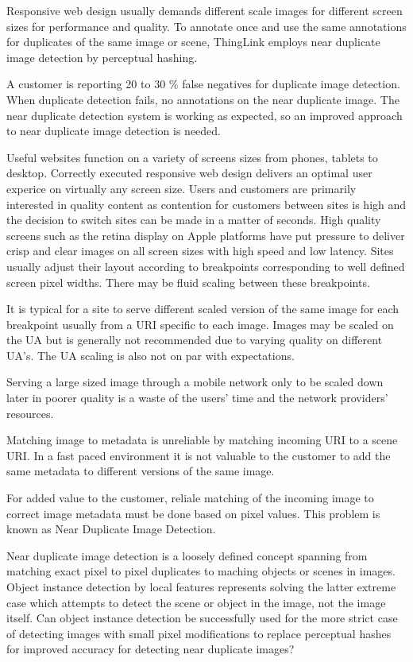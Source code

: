 \documentclass[english,12pt,a4paper,pdftex,elec,utf8]{aaltothesis}
\begin{document}
Responsive web design usually demands different scale images for different screen sizes for performance and quality. To annotate once and use the same annotations for duplicates of the same image or scene, ThingLink employs near duplicate image detection by perceptual hashing.

A customer is reporting 20 to 30 \% false negatives for duplicate image detection. When duplicate detection fails,  no annotations on the near duplicate image. The near duplicate detection system is working as expected, so an improved approach to near duplicate image detection is needed.

Useful websites function on a variety of screens sizes from phones, tablets to desktop. Correctly executed responsive web design delivers an optimal user experice on virtually any screen size. Users and customers are primarily interested in quality content as contention for customers between sites is high and the decision to switch sites can be made in a matter of seconds. High quality screens such as the retina display on Apple platforms have put pressure to deliver crisp and clear images on all screen sizes with high speed and low latency. Sites usually adjust their layout according to breakpoints corresponding to well defined screen pixel widths. There may be fluid scaling between these breakpoints.

It is typical for a site to serve different scaled version of the same image for each breakpoint usually from a URI specific to each image. Images may be scaled on the UA but is generally not recommended due to varying quality on different UA's. The UA scaling is also not on par with expectations.

Serving a large sized image through a mobile network only to be scaled down later in poorer quality is a waste of the users' time and the network providers' resources.

Matching image to metadata is unreliable by matching incoming URI to a scene URI. In a fast paced environment it is not valuable to the customer to add the same metadata to different versions of the same image.

For added value to the customer, reliale matching of the incoming image to correct image metadata must be done based on pixel values. This problem is known as Near Duplicate Image Detection.

Near duplicate image detection is a loosely defined concept spanning from matching exact pixel to pixel duplicates to maching objects or scenes in images. Object instance detection by local features represents solving the latter extreme case which attempts to detect the scene or object in the image, not the image itself. Can object instance detection be successfully used for the more strict case of detecting images with small pixel modifications to replace perceptual hashes for improved accuracy for detecting near duplicate images?
\end{document}
